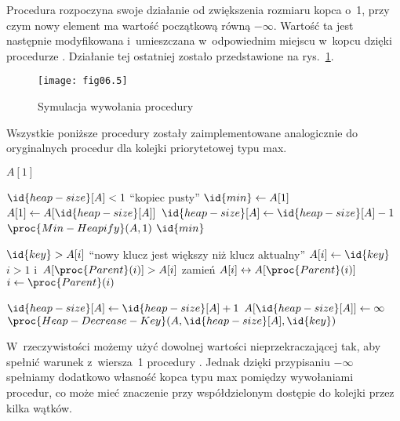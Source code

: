 \exercise %
Procedura  rozpoczyna swoje działanie od zwiększenia rozmiaru kopca o~1, przy czym nowy element ma wartość początkową równą $-\infty$. Wartość ta jest następnie modyfikowana i~umieszczana w~odpowiednim miejscu w~kopcu dzięki procedurze . Działanie tej ostatniej zostało przedstawione na rys.~\ref{fig:6.5-2}.
\begin{figure}[ht]
	\begin{center}
		\texttt{[image: fig06.5]}
	\end{center}
	\caption{Symulacja wywołania procedury } \label{fig:6.5-2}
\end{figure}

\exercise %
Wszystkie poniższe procedury zostały zaimplementowane analogicznie do oryginalnych procedur dla kolejki priorytetowej typu max.
\begin{codebox}
\li	\Return $A[1]$
\end{codebox}

\begin{codebox}
\li	\If $\id{heap-size}[A]<1$
\li		\Then \Error ``kopiec pusty''
		\End
\li	$\id{min}\gets A[1]$
\li	$A[1]\gets A[\id{heap-size}[A]]$
\li	$\id{heap-size}[A]\gets\id{heap-size}[A]-1$
\li	$\proc{Min-Heapify}(A,1)$
\li	\Return $\id{min}$
\end{codebox}

\begin{codebox}
\li	\If $\id{key}>A[i]$
\li		\Then
			\Error ``nowy klucz jest większy niż klucz aktualny''
		\End
\li	$A[i]\gets\id{key}$
\li	\While $i>1$ i~$A[\proc{Parent}(i)]>A[i]$
\li		\Do
			zamień $A[i]\leftrightarrow A[\proc{Parent}(i)]$
\li			$i\gets\proc{Parent}(i)$
		\End
\end{codebox}

\begin{codebox}
\li	$\id{heap-size}[A]\gets\id{heap-size}[A]+1$
\li	$A[\id{heap-size}[A]]\gets\infty$
\li	$\proc{Heap-Decrease-Key}(A,\id{heap-size}[A],\id{key})$
\end{codebox}

\exercise %
W~rzeczywistości możemy użyć dowolnej wartości nieprzekraczającej  tak, aby spełnić warunek z~wiersza~1 procedury . Jednak dzięki przypisaniu $-\infty$ spełniamy dodatkowo własność kopca typu max pomiędzy wywołaniami procedur, co może mieć znaczenie przy współdzielonym dostępie do kolejki przez kilka wątków.

